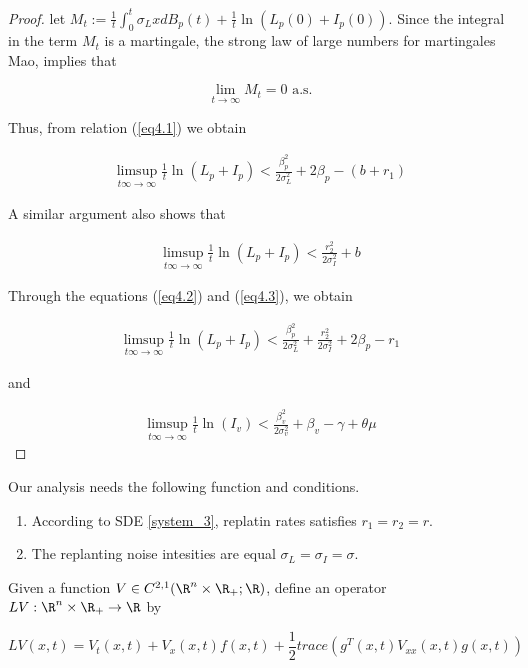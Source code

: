 \begin{proof}
	let $M_t :=\frac{1}{t}\int_{0}^{t}\sigma_L xdB_p(t)+\frac{1}{t}\ln(L_p(0)+I_p(0))$. Since the integral in the term $M_t$ is a martingale, the strong law of large numbers for martingales Mao, implies that 
	
	\begin{equation*}
		\lim\limits_{t \rightarrow \infty}M_t = 0\,\,\mbox{a.s.}
	\end{equation*}
	
	Thus, from relation (\ref{eq4.1}) we obtain
	
	\begin{align}\label{eq4.2}
		\limsup_{t\infty \rightarrow \infty}\frac{1}{t}\ln(L_p+I_p)<\frac{\beta_p^2}{2\sigma_L^2}+	2\beta_p-(b+r_1)
	\end{align}
	
	A similar argument also shows that
	
	\begin{align}\label{eq4.3}
		\limsup_{t\infty \rightarrow \infty}\frac{1}{t}\ln(L_p+I_p)<\frac{r_2^2}{2\sigma_I^2}+b
	\end{align}
	
	Through the equations (\ref{eq4.2}) and (\ref{eq4.3}), we obtain
	
	\begin{align*}
		\limsup_{t\infty \rightarrow \infty}\frac{1}{t}\ln(L_p+I_p)<\frac{\beta_p^2}{2\sigma_L^2}+\frac{r_2^2}{2\sigma_I^2}+	2\beta_p-r_1
	\end{align*}
	
	and 
	
	\begin{align*}
		\limsup_{t\infty \rightarrow \infty}\frac{1}{t}\ln(I_v)<\frac{\beta_v^2}{2\sigma_v^2}+\beta_v-\gamma+\theta\mu
	\end{align*}
\end{proof}



Our analysis needs the following function and conditions.
\begin{enumerate}[(H-1)]
	\item
	According to SDE \eqref{system_3}, replatin rates satisfies 
	$r_1=r_2 = r$. 
	\item
	The replanting noise intesities are equal
	$\sigma_L = \sigma_I = \sigma$.
\end{enumerate}
Given a function $V\in C^{2,1}(\R^n\times\R_{+};\R)$, define an operator $LV:\R^n\times\R_{+}\rightarrow\R$ by

\begin{equation}\label{InfiOpera}
	LV(x,t) = V_t(x,t)+V_x(x,t)f(x,t)+\frac{1}{2}trace(g^T(x,t)V_{xx}(x,t)g(x,t))
\end{equation}


